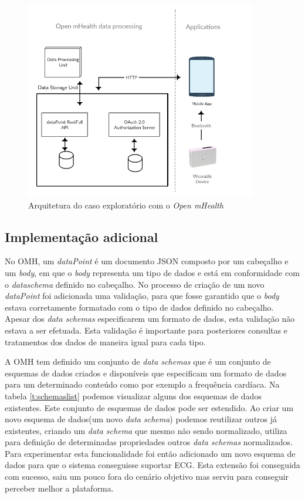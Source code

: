 \begin{figure}[H]
  \centering
  \includegraphics[width=0.9\textwidth]{imgs/omh-arch-exp.png}
  \caption[Arquitetura do caso exploratório com o \textit{Open mHealth}]{Arquitetura do caso exploratório com o \textit{Open mHealth}}
  
  \label{f:exp-omh-arch}
\end{figure}

\subsection{Implementação adicional}
\label{additionalImpl-omh}
No \gls{OMH}, um \textit{dataPoint} é um documento \gls{JSON} composto por um cabeçalho e um \textit{body}, em que o \textit{body} representa um tipo de dados e está em conformidade com o \textit{dataschema} definido no cabeçalho.
No processo de criação de um novo \textit{dataPoint} foi adicionada uma validação, para que fosse garantido que o \textit{body} estava corretamente formatado com o tipo de dados definido no cabeçalho.
Apesar dos \textit{data schemas} especificarem um formato de dados, esta validação não estava a ser efetuada. Esta validação é importante para posteriores consultas e tratamentos dos dados de maneira igual para cada tipo.
\par 


A \gls{OMH} tem definido um conjunto de \textit{data schemas} \cite{omhschemas} que é um conjunto de esquemas de dados criados e disponíveis que especificam um formato de dados para um determinado conteúdo como por exemplo a frequência cardíaca\cite{omhschemas}. Na tabela \ref{t:schemaslist} podemos visualizar alguns dos esquemas de dados existentes. Este conjunto de esquemas de dados pode ser estendido. Ao criar um novo esquema de dados(um novo \textit{data schema}) podemos reutilizar outros já existentes, criando um \textit{data schema} que mesmo não sendo normalizado, utiliza para definição de determinadas propriedades outros \textit{data schemas} normalizados. Para experimentar esta funcionalidade foi então adicionado um novo esquema de dados para que o sistema conseguisse suportar \gls{ECG}. Esta extensão foi conseguida com sucesso, saiu um pouco fora do cenário objetivo mas serviu para conseguir perceber melhor a plataforma. \par 
\newpage

